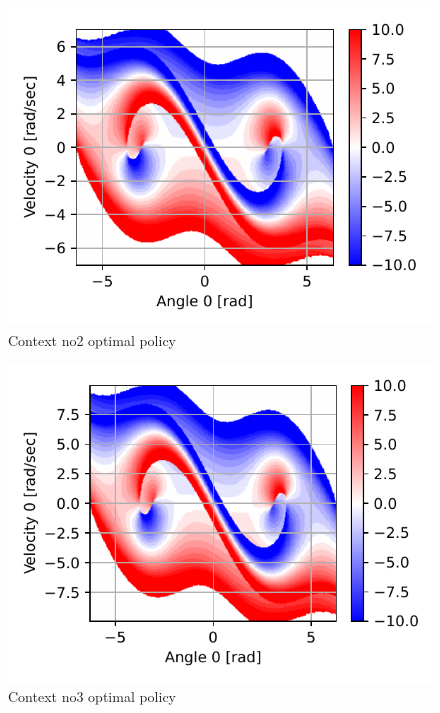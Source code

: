 \begin{figure}[p]
\begin{center}
\includegraphics[width=0.99\linewidth]{fig/c2_policy.pdf}
\caption{Context no2 optimal policy}\label{fig:c1_policy}
\end{center}
\end{figure}

\begin{figure}[p]
\begin{center}
\includegraphics[width=0.99\linewidth]{fig/c3_policy.pdf}
\caption{Context no3 optimal policy}\label{fig:c1_policy}
\end{center}
\end{figure}


